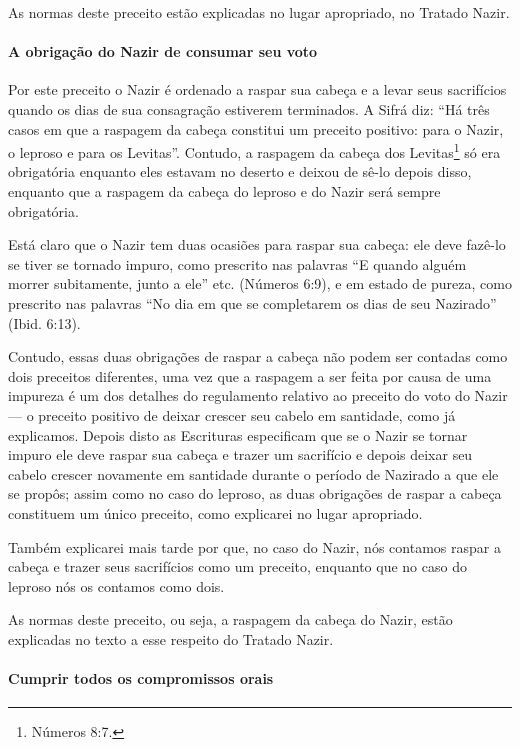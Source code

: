 As normas deste preceito estão explicadas no lugar apropriado, no Tratado Nazir.

\paragraph{A obrigação do Nazir de consumar seu voto}

Por este preceito o Nazir é ordenado a raspar sua cabeça e a levar seus
sacrifícios quando os dias de sua consagração estiverem terminados. A
Sifrá diz: ``Há três casos em que a raspagem da cabeça constitui um
preceito positivo: para o Nazir, o leproso e para os Levitas''.
Contudo, a raspagem da cabeça dos Levitas\footnote{Números 8:7.} só era
obrigatória enquanto eles estavam no deserto e deixou de sê-lo depois disso, enquanto que a raspagem da cabeça do leproso e do Nazir será sempre obrigatória.

Está claro que o Nazir tem duas ocasiões para raspar sua cabeça: ele
deve fazê-lo se tiver se tornado impuro, como prescrito nas palavras ``E
quando alguém morrer subitamente, junto a ele'' etc. (Números 6:9), e
em estado de pureza, como prescrito nas palavras ``No dia em que se
completarem os dias de seu Nazirado'' (Ibid. 6:13).

Contudo, essas duas obrigações de raspar a cabeça não podem ser contadas
como dois preceitos diferentes, uma vez que a raspagem a ser feita por
causa de uma impureza é um dos detalhes do regulamento relativo ao
preceito do voto do Nazir --- o preceito positivo de deixar crescer seu
cabelo em santidade, como já explicamos. Depois disto as Escrituras
especificam que se o Nazir se tornar impuro ele deve raspar sua cabeça e
trazer um sacrifício e depois deixar seu cabelo crescer novamente em
santidade durante o período de Nazirado a que ele se propôs; assim como
no caso do leproso, as duas obrigações de raspar a cabeça constituem um
único preceito, como explicarei no lugar apropriado.

Também explicarei mais tarde por que, no caso do Nazir, nós contamos
raspar a cabeça e trazer seus sacrifícios como um preceito, enquanto que
no caso do leproso nós os contamos como dois.

As normas deste preceito, ou seja, a raspagem da cabeça do Nazir, estão
explicadas no texto a esse respeito do Tratado Nazir.

\paragraph{Cumprir todos os compromissos orais}

